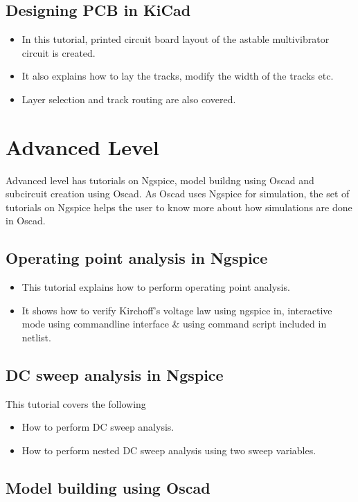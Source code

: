 \subsection{Designing PCB in KiCad}

\begin{itemize}
\item In this tutorial, printed circuit board layout of the astable multivibrator circuit is created.
\item It also explains how to lay the tracks, modify the width of the tracks etc.
\item Layer selection and track routing are also covered.
\end{itemize}

\section{Advanced Level}

Advanced level has tutorials on Ngspice, model buildng using Oscad and subcircuit creation using Oscad. As Oscad uses Ngspice for simulation, the set of tutorials on Ngspice helps the user to know more about how simulations are done in Oscad.

\subsection{Operating point analysis in Ngspice}
\begin{itemize}
\item This tutorial explains how to perform operating point analysis.
\item It shows how to verify Kirchoff's voltage law using ngspice in, interactive mode using
command­line interface \& using command script included in netlist.
\end{itemize}



\subsection{DC sweep analysis in Ngspice}

This tutorial covers the following
\begin{itemize}
\item How to perform DC sweep  analysis.
\item How to perform nested DC sweep analysis using two sweep variables.
\end{itemize}

\subsection{Model building using Oscad}


